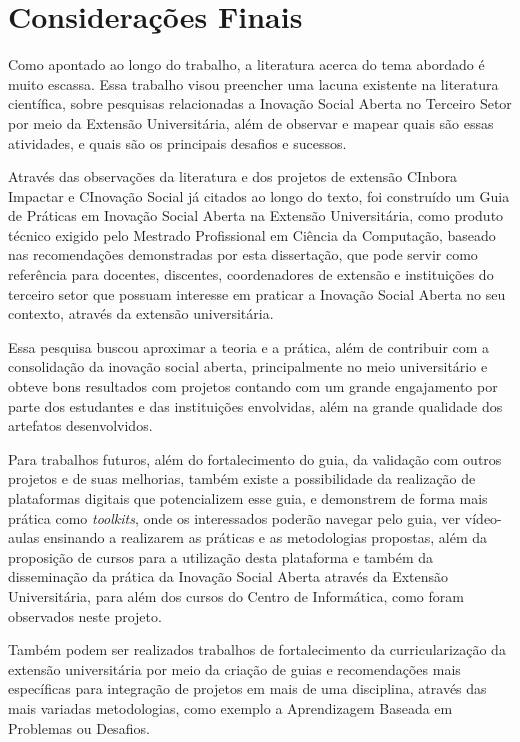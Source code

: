 \chapter{Considerações Finais}
\label{chap:consideracoesfinais}

Como apontado ao longo do trabalho, a literatura acerca do tema abordado é muito escassa. Essa trabalho visou preencher uma lacuna existente na literatura científica, sobre pesquisas relacionadas a Inovação Social Aberta no Terceiro Setor por meio da Extensão Universitária, além de observar e mapear quais são essas atividades, e quais são os principais desafios e sucessos.

Através das observações da literatura e dos projetos de extensão CInbora Impactar e CInovação Social já citados ao longo do texto, foi construído um Guia de Práticas em Inovação Social Aberta na Extensão Universitária, como produto técnico exigido pelo Mestrado Profissional em Ciência da Computação, baseado nas recomendações demonstradas por esta dissertação, que pode servir como referência para docentes, discentes, coordenadores de extensão e instituições do terceiro setor que possuam interesse em praticar a Inovação Social Aberta no seu contexto, através da extensão universitária.

Essa pesquisa buscou aproximar a teoria e a prática, além de contribuir com a consolidação da inovação social aberta, principalmente no meio universitário e obteve bons resultados com projetos contando com um grande engajamento por parte dos estudantes e das instituições envolvidas, além na grande qualidade dos artefatos desenvolvidos.

Para trabalhos futuros, além do fortalecimento do guia, da validação com outros projetos e de suas melhorias, também existe a possibilidade da realização de plataformas digitais que potencializem esse guia, e demonstrem de forma mais prática como \textit{toolkits}, onde os interessados poderão navegar pelo guia, ver vídeo-aulas ensinando a realizarem as práticas e as metodologias propostas, além da proposição de cursos para a utilização desta plataforma e também da disseminação da prática da Inovação Social Aberta através da Extensão Universitária, para além dos cursos do Centro de Informática, como foram observados neste projeto. 

Também podem ser realizados trabalhos de fortalecimento da curricularização da extensão universitária por meio da criação de guias e recomendações mais específicas para integração de projetos em mais de uma disciplina, através das mais variadas metodologias, como exemplo a Aprendizagem Baseada em Problemas ou Desafios.